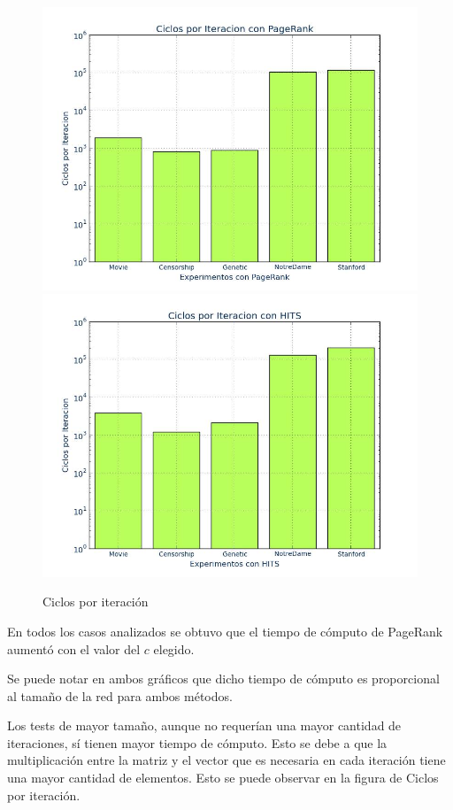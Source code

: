 \documentclass[a4paper]{article}
\begin{document}
\begin{figure}[htbp]
\centering
\includegraphics[scale=0.27]{img/CiclosporIterPG.jpg}
\includegraphics[scale=0.27]{img/CiclosporIterHITS.jpg}
\caption{Ciclos por iteración}
\end{figure}

\newpage

En todos los casos analizados se obtuvo que el tiempo de cómputo de PageRank aumentó con el valor del $c$ elegido.

Se puede notar en ambos gráficos que dicho tiempo de cómputo es proporcional al tamaño de la red para ambos métodos. 

Los tests de mayor tamaño, aunque no requerían una mayor cantidad de iteraciones, sí tienen mayor tiempo de cómputo. Esto se debe a que la multiplicación entre la matriz y el vector que es necesaria en cada iteración tiene una mayor cantidad de elementos. Esto se puede observar en la figura de Ciclos por iteración.
\end{document}
